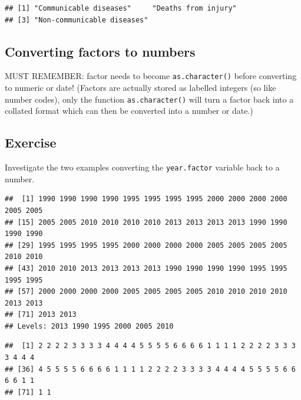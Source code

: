 \documentclass[]{book}
\makeatletter
\newenvironment{Shaded}{\begin{snugshade}}{\end{snugshade}}
\newcommand{\KeywordTok}[1]{\textcolor[rgb]{0.13,0.29,0.53}{\textbf{#1}}}
\newcommand{\StringTok}[1]{\textcolor[rgb]{0.31,0.60,0.02}{#1}}
\newcommand{\OperatorTok}[1]{\textcolor[rgb]{0.81,0.36,0.00}{\textbf{#1}}}
\newcommand{\NormalTok}[1]{#1}
\newenvironment{kframe}{%
\medskip{}
\setlength{\fboxsep}{.8em}
 \def\at@end@of@kframe{}%
 \ifinner\ifhmode%
  \def\at@end@of@kframe{\end{minipage}}%
  \begin{minipage}{\columnwidth}%
 \fi\fi%
 \def\FrameCommand##1{\hskip\@totalleftmargin \hskip-\fboxsep
 \colorbox{shadecolor}{##1}\hskip-\fboxsep
     \hskip-\linewidth \hskip-\@totalleftmargin \hskip\columnwidth}%
 \MakeFramed {\advance\hsize-\width
   \@totalleftmargin\z@ \linewidth\hsize
   \@setminipage}}%
 {\par\unskip\endMakeFramed%
 \at@end@of@kframe}
\renewenvironment{Shaded}{\begin{kframe}}{\end{kframe}}
\makeatother
\begin{document}
\begin{verbatim}
## [1] "Communicable diseases"     "Deaths from injury"       
## [3] "Non-communicable diseases"
\end{verbatim}

\subsection{Converting factors to
numbers}\label{converting-factors-to-numbers}

MUST REMEMBER: factor needs to become \texttt{as.character()} before
converting to numeric or date! (Factors are actually stored as labelled
integers (so like number codes), only the function
\texttt{as.character()} will turn a factor back into a collated format
which can then be converted into a number or date.)

\subsection{Exercise}\label{exercise-22}

Investigate the two examples converting the \texttt{year.factor}
variable back to a number.

\begin{Shaded}
\end{Shaded}

\begin{verbatim}
##  [1] 1990 1990 1990 1990 1995 1995 1995 1995 2000 2000 2000 2000 2005 2005
## [15] 2005 2005 2010 2010 2010 2010 2013 2013 2013 2013 1990 1990 1990 1990
## [29] 1995 1995 1995 1995 2000 2000 2000 2000 2005 2005 2005 2005 2010 2010
## [43] 2010 2010 2013 2013 2013 2013 1990 1990 1990 1990 1995 1995 1995 1995
## [57] 2000 2000 2000 2000 2005 2005 2005 2005 2010 2010 2010 2010 2013 2013
## [71] 2013 2013
## Levels: 2013 1990 1995 2000 2005 2010
\end{verbatim}

\begin{Shaded}
\end{Shaded}

\begin{verbatim}
##  [1] 2 2 2 2 3 3 3 3 4 4 4 4 5 5 5 5 6 6 6 6 1 1 1 1 2 2 2 2 3 3 3 3 4 4 4
## [36] 4 5 5 5 5 6 6 6 6 1 1 1 1 2 2 2 2 3 3 3 3 4 4 4 4 5 5 5 5 6 6 6 6 1 1
## [71] 1 1
\end{verbatim}
\end{document}
